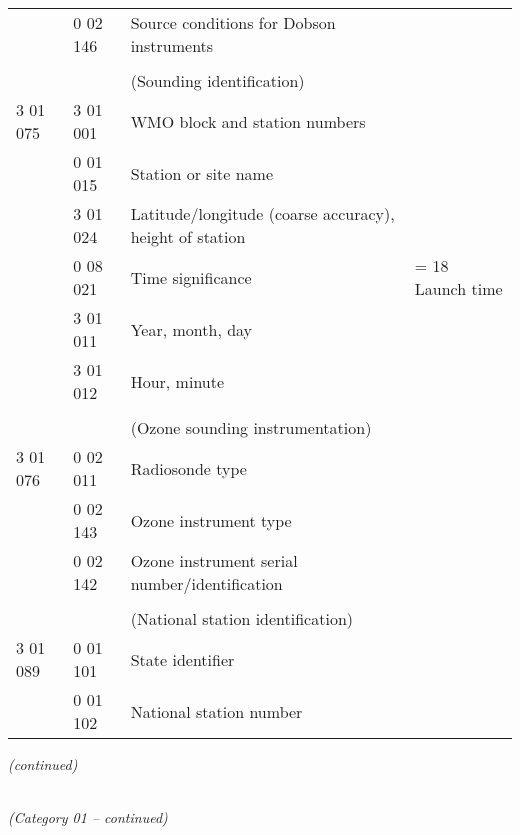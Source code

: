 \begin{longtable}[]{@{}llll@{}}
& 0 02 146 & Source conditions for Dobson instruments &\tabularnewline
& & &\tabularnewline
& & (Sounding identification) &\tabularnewline
3 01 075 & 3 01 001 & WMO block and station numbers &\tabularnewline
& 0 01 015 & Station or site name &\tabularnewline
& 3 01 024 & Latitude/longitude (coarse accuracy), height of station &\tabularnewline
& 0 08 021 & Time significance & = 18 Launch time\tabularnewline
& 3 01 011 & Year, month, day &\tabularnewline
& 3 01 012 & Hour, minute &\tabularnewline
& & &\tabularnewline
& & (Ozone sounding instrumentation) &\tabularnewline
3 01 076 & 0 02 011 & Radiosonde type &\tabularnewline
& 0 02 143 & Ozone instrument type &\tabularnewline
& 0 02 142 & Ozone instrument serial number/identification &\tabularnewline
& & &\tabularnewline
& & (National station identification) &\tabularnewline
3 01 089 & 0 01 101 & State identifier &\tabularnewline
& 0 01 102 & National station number &\tabularnewline
\bottomrule
\end{longtable}

\emph{(continued)}

\emph{\\
(Category 01 -- continued)}

